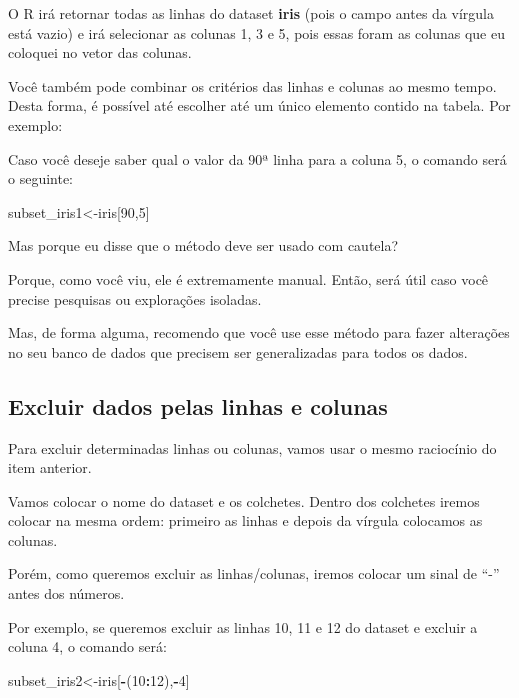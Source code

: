 \documentclass[
]{book}
\newenvironment{Shaded}{\begin{snugshade}}{\end{snugshade}}
\newcommand{\DecValTok}[1]{\textcolor[rgb]{0.00,0.00,0.81}{#1}}
\newcommand{\NormalTok}[1]{#1}
\newcommand{\OperatorTok}[1]{\textcolor[rgb]{0.81,0.36,0.00}{\textbf{#1}}}
\begin{document}
O R irá retornar todas as linhas do dataset \textbf{iris} (pois o campo
antes da vírgula está vazio) e irá selecionar as colunas 1, 3 e 5, pois
essas foram as colunas que eu coloquei no vetor das colunas.

Você também pode combinar os critérios das linhas e colunas ao mesmo
tempo. Desta forma, é possível até escolher até um único elemento
contido na tabela. Por exemplo:

Caso você deseje saber qual o valor da 90ª linha para a coluna 5, o
comando será o seguinte:

\begin{Shaded}
\begin{Highlighting}[]
\NormalTok{subset_iris1<-iris[}\DecValTok{90}\NormalTok{,}\DecValTok{5}\NormalTok{]}
\end{Highlighting}
\end{Shaded}

Mas porque eu disse que o método deve ser usado com cautela?

Porque, como você viu, ele é extremamente manual. Então, será útil caso
você precise pesquisas ou explorações isoladas.

Mas, de forma alguma, recomendo que você use esse método para fazer
alterações no seu banco de dados que precisem ser generalizadas para
todos os dados.

\hypertarget{excluir-dados-pelas-linhas-e-colunas}{%
\subsection{Excluir dados pelas linhas e
colunas}\label{excluir-dados-pelas-linhas-e-colunas}}

Para excluir determinadas linhas ou colunas, vamos usar o mesmo
raciocínio do item anterior.

Vamos colocar o nome do dataset e os colchetes. Dentro dos colchetes
iremos colocar na mesma ordem: primeiro as linhas e depois da vírgula
colocamos as colunas.

Porém, como queremos excluir as linhas/colunas, iremos colocar um sinal
de ``-'' antes dos números.

Por exemplo, se queremos excluir as linhas 10, 11 e 12 do dataset e
excluir a coluna 4, o comando será:

\begin{Shaded}
\begin{Highlighting}[]
\NormalTok{subset_iris2<-iris[}\OperatorTok{-}\NormalTok{(}\DecValTok{10}\OperatorTok{:}\DecValTok{12}\NormalTok{),}\OperatorTok{-}\DecValTok{4}\NormalTok{]}
\end{Highlighting}
\end{Shaded}
\end{document}
